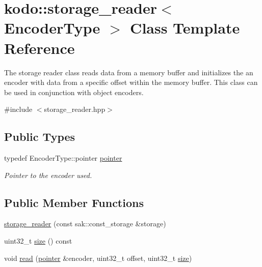 \hypertarget{classkodo_1_1storage__reader}{\section{kodo\-:\-:storage\-\_\-reader$<$ Encoder\-Type $>$ Class Template Reference}
\label{classkodo_1_1storage__reader}
}


The storage reader class reads data from a memory buffer and initializes the an encoder with data from a specific offset within the memory buffer. This class can be used in conjunction with object encoders.  




{\ttfamily \#include $<$storage\-\_\-reader.\-hpp$>$}

\subsection*{Public Types}
\begin{DoxyCompactItemize}
\item 
\hypertarget{classkodo_1_1storage__reader_a0a8080e691fe144861ac649c7b72012e}{typedef Encoder\-Type\-::pointer \hyperlink{classkodo_1_1storage__reader_a0a8080e691fe144861ac649c7b72012e}{pointer}}\label{classkodo_1_1storage__reader_a0a8080e691fe144861ac649c7b72012e}

\begin{DoxyCompactList}\small\item\em Pointer to the encoder used. \end{DoxyCompactList}\end{DoxyCompactItemize}
\subsection*{Public Member Functions}
\begin{DoxyCompactItemize}
\item 
\hyperlink{classkodo_1_1storage__reader_ad5c83655e536cd7652cc18d6dd066914}{storage\-\_\-reader} (const sak\-::const\-\_\-storage \&storage)
\item 
uint32\-\_\-t \hyperlink{classkodo_1_1storage__reader_a0f82c2427898aa2745323ac5cfbded64}{size} () const 
\item 
void \hyperlink{classkodo_1_1storage__reader_abe315279d06f2a78f91b60e1f7a6171d}{read} (\hyperlink{classkodo_1_1storage__reader_a0a8080e691fe144861ac649c7b72012e}{pointer} \&encoder, uint32\-\_\-t offset, uint32\-\_\-t \hyperlink{classkodo_1_1storage__reader_a0f82c2427898aa2745323ac5cfbded64}{size})
\end{DoxyCompactItemize}


